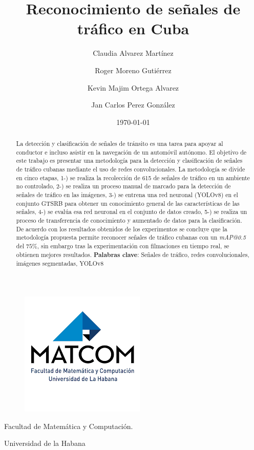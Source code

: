 \documentclass{article}
\title{Reconocimiento de señales de tráfico en Cuba}
\author {
Claudia Alvarez Martínez \and
Roger Moreno Gutiérrez \and
Kevin Majim Ortega Alvarez \and
Jan Carlos Perez González
}
\date {\today}
\begin{document}
\begin{figure}[t]
    \centering
    \includegraphics{resources/logo matcompng.png}
\end{figure}
\maketitle
\begin{center}
Facultad de Matemática y Computación.

 Universidad de la Habana
\end{center}
\newpage
\begin{abstract}
La detección y clasificación de señales de tránsito es una tarea para apoyar al conductor e incluso asistir en la navegación de un automóvil autónomo. El objetivo de este trabajo es presentar una metodología para la detección y clasificación de señales de tráfico cubanas mediante el uso de redes convolucionales. La metodología se divide en cinco etapas, 1-) se realiza la recolección de 615 de señales de tráfico en un ambiente no controlado, 2-) se realiza un proceso manual de marcado para la detección de señales de tráfico en las imágenes, 3-) se entrena una red neuronal (YOLOv8) en el conjunto GTSRB para obtener un conocimiento general de las características de las señales, 4-) se evalúa esa red neuronal en el conjunto de datos creado, 5-) se realiza un proceso de transferencia de conocimiento y aumentado de datos para la clasificación. De acuerdo con los resultados obtenidos de los experimentos se concluye que la metodología propuesta permite reconocer señales de tráfico cubanas con un \textit{mAP@0.5} del $75\%$, sin embargo tras la experimentación con filmaciones en tiempo real, se obtienen mejores resultados.
\vfill
\textbf{Palabras clave}: Señales de tráfico, redes convolucionales, imágenes segmentadas, YOLOv8
\end{abstract}
\newpage


\end{document}
